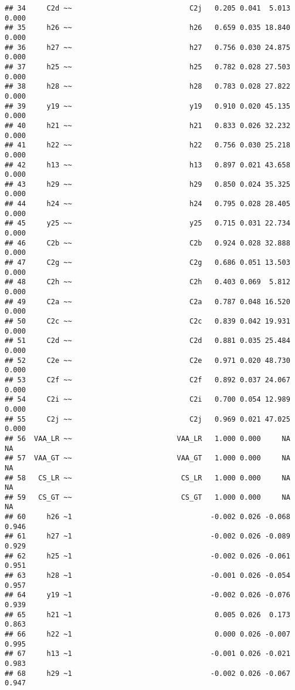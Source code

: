 \documentclass[
]{article}
\begin{document}
\begin{verbatim}
## 34     C2d ~~                            C2j   0.205 0.041  5.013  0.000
## 35     h26 ~~                            h26   0.659 0.035 18.840  0.000
## 36     h27 ~~                            h27   0.756 0.030 24.875  0.000
## 37     h25 ~~                            h25   0.782 0.028 27.503  0.000
## 38     h28 ~~                            h28   0.783 0.028 27.822  0.000
## 39     y19 ~~                            y19   0.910 0.020 45.135  0.000
## 40     h21 ~~                            h21   0.833 0.026 32.232  0.000
## 41     h22 ~~                            h22   0.756 0.030 25.218  0.000
## 42     h13 ~~                            h13   0.897 0.021 43.658  0.000
## 43     h29 ~~                            h29   0.850 0.024 35.325  0.000
## 44     h24 ~~                            h24   0.795 0.028 28.405  0.000
## 45     y25 ~~                            y25   0.715 0.031 22.734  0.000
## 46     C2b ~~                            C2b   0.924 0.028 32.888  0.000
## 47     C2g ~~                            C2g   0.686 0.051 13.503  0.000
## 48     C2h ~~                            C2h   0.403 0.069  5.812  0.000
## 49     C2a ~~                            C2a   0.787 0.048 16.520  0.000
## 50     C2c ~~                            C2c   0.839 0.042 19.931  0.000
## 51     C2d ~~                            C2d   0.881 0.035 25.484  0.000
## 52     C2e ~~                            C2e   0.971 0.020 48.730  0.000
## 53     C2f ~~                            C2f   0.892 0.037 24.067  0.000
## 54     C2i ~~                            C2i   0.700 0.054 12.989  0.000
## 55     C2j ~~                            C2j   0.969 0.021 47.025  0.000
## 56  VAA_LR ~~                         VAA_LR   1.000 0.000     NA     NA
## 57  VAA_GT ~~                         VAA_GT   1.000 0.000     NA     NA
## 58   CS_LR ~~                          CS_LR   1.000 0.000     NA     NA
## 59   CS_GT ~~                          CS_GT   1.000 0.000     NA     NA
## 60     h26 ~1                                 -0.002 0.026 -0.068  0.946
## 61     h27 ~1                                 -0.002 0.026 -0.089  0.929
## 62     h25 ~1                                 -0.002 0.026 -0.061  0.951
## 63     h28 ~1                                 -0.001 0.026 -0.054  0.957
## 64     y19 ~1                                 -0.002 0.026 -0.076  0.939
## 65     h21 ~1                                  0.005 0.026  0.173  0.863
## 66     h22 ~1                                  0.000 0.026 -0.007  0.995
## 67     h13 ~1                                 -0.001 0.026 -0.021  0.983
## 68     h29 ~1                                 -0.002 0.026 -0.067  0.947

\end{verbatim}
\end{document}
